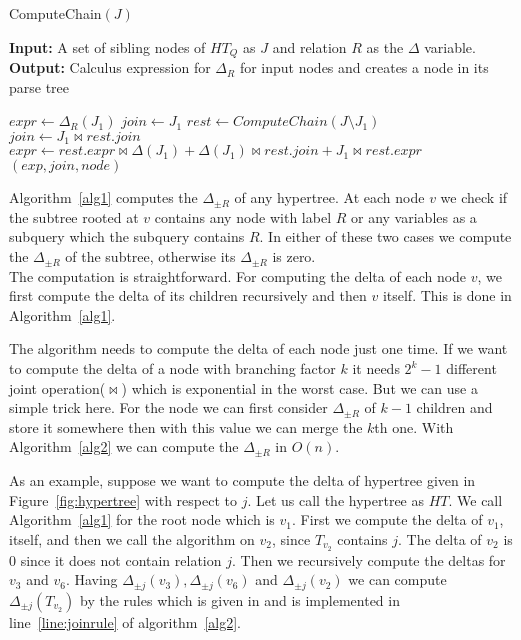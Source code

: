 \documentclass[12pt]{article}
\begin{document}
\begin{algorithm}[H]
\caption{ComputeChain$(J)$} 
\label{alg2}
\textbf{Input:} A set of sibling nodes of $HT_{Q}$ as $J$ and relation $R$ as the $\Delta$ variable.\\
\textbf{Output:} Calculus expression for $\Delta_{R}$ for input nodes and creates a node in its parse tree\\
\begin{algorithmic}[1]
\STATE $expr\gets \Delta_{R}(J_{1})$ 
\STATE $join\gets J_{1}$
\ELSE
\STATE $rest\gets ComputeChain(J\setminus J_{1})$
\STATE $join\gets J_{1}\Join rest.join$
\STATE $expr\gets rest.expr\Join \Delta(J_{1})+\Delta(J_{1})\Join rest.join+J_{1}\Join rest.expr$ \label{line:joinrule}
\ENDIF
\RETURN $(exp,join,node)$
\end{algorithmic}
\end{algorithm}
Algorithm~\ref{alg1} computes the $\Delta_{\pm R}$ of any hypertree. At each node $v$ we check if the subtree rooted at $v$ contains any node with label $R$ or any variables as a subquery which the subquery contains $R$. In either of these two cases we compute the $\Delta_{\pm R}$ of the subtree, otherwise its $\Delta_{\pm R}$ is zero. \\
The computation is straightforward. For computing the delta of each node $v$, we first compute the delta of its children recursively  and then $v$ itself. This is done in Algorithm~\ref{alg1}. 
\par
The algorithm needs to compute the delta of each node just one time. If we want to compute the delta of a node with branching factor $k$ it needs $2^{k}-1$ different joint operation($\Join$) which is exponential in the worst case. But we can use a simple trick here. For the node we can first consider $\Delta_{\pm R}$ of $k-1$ children and store it somewhere then with this value we can merge the $k$th one. With Algorithm~\ref{alg2} we can compute the $\Delta_{\pm R}$ in $O(n)$.\par
As an example, suppose we want to compute the delta of hypertree given in Figure~\ref{fig:hypertree} with respect to $j$. Let us call the hypertree as $HT$. We call Algorithm~\ref{alg1} for the root node which is $v_{1}$. First we compute the delta of $v_{1}$, itself, and then we call the algorithm on $v_{2}$, since $T_{v_{2}}$ contains $j$. The delta of $v_{2}$ is 0 since it does not contain relation $j$. Then we recursively compute the deltas for $v_{3}$ and $v_{6}$. Having $\Delta_{\pm j}(v_{3}), \Delta_{\pm j}(v_{6})$ and $\Delta_{\pm j}(v_{2})$ we can compute $\Delta_{\pm j}(T_{v_{2}})$ by the rules which is given in \cite{2} and is implemented in line~\ref{line:joinrule} of algorithm~\ref{alg2}.
\end{document}
